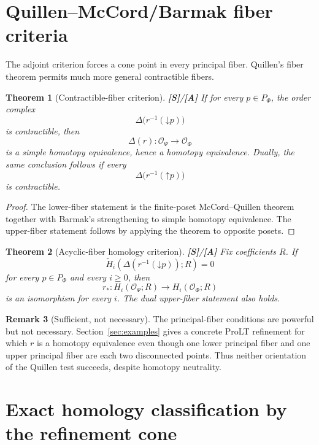 \documentclass[11pt]{article}
\newtheorem{theorem}{Theorem}[section]
\theoremstyle{definition}
\newtheorem{remark}[theorem]{Remark}
\newcommand{\OX}{\mathcal O}
\newcommand{\redhom}{\widetilde H}
\newcommand{\statusS}{\textbf{[S]}}
\newcommand{\statusA}{\textbf{[A]}}
\newcommand{\down}{\mathord\downarrow}
\newcommand{\up}{\mathord\uparrow}
\begin{document}
\section{Quillen--McCord/Barmak fiber criteria}

The adjoint criterion forces a cone point in every principal fiber. Quillen's fiber theorem permits much more general contractible fibers.

\begin{theorem}[Contractible-fiber criterion]\label{thm:quillen}
\statusS/\statusA\;
If for every \(p\in P_\Phi\), the order complex
\[
\Delta\bigl(r^{-1}(\down p)\bigr)
\]
is contractible, then
\[
\Delta(r):\OX_\Psi\longrightarrow\OX_\Phi
\]
is a simple homotopy equivalence, hence a homotopy equivalence. Dually, the same conclusion follows if every
\[
\Delta\bigl(r^{-1}(\up p)\bigr)
\]
is contractible.
\end{theorem}

\begin{proof}
The lower-fiber statement is the finite-poset McCord--Quillen theorem together with Barmak's strengthening to simple homotopy equivalence. The upper-fiber statement follows by applying the theorem to opposite posets.
\end{proof}

\begin{theorem}[Acyclic-fiber homology criterion]\label{thm:acyclicfiber}
\statusS/\statusA\;
Fix coefficients \(R\). If
\[
\redhom_i\!\left(\Delta(r^{-1}(\down p));R\right)=0
\]
for every \(p\in P_\Phi\) and every \(i\ge0\), then
\[
r_*:H_i(\OX_\Psi;R)\longrightarrow H_i(\OX_\Phi;R)
\]
is an isomorphism for every \(i\). The dual upper-fiber statement also holds.
\end{theorem}

\begin{remark}[Sufficient, not necessary]\label{rem:notnecessary}
The principal-fiber conditions are powerful but not necessary. Section~\ref{sec:examples} gives a concrete ProLT refinement for which \(r\) is a homotopy equivalence even though one lower principal fiber and one upper principal fiber are each two disconnected points. Thus neither orientation of the Quillen test succeeds, despite homotopy neutrality.
\end{remark}

\section{Exact homology classification by the refinement cone}
\end{document}
